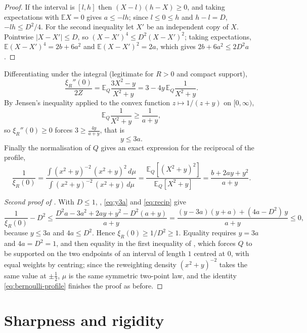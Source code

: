 \documentclass[11pt]{amsart}
\theoremstyle{definition}
\newcommand{\E}{\mathbb{E}}
\begin{document}
\begin{proof}
If the interval is $[l,h]$ then $(X-l)(h-X)\ge0$, and taking expectations with $\E X=0$ gives $a\le-lh$; since $l\le0\le h$ and $h-l=D$, $-lh\le D^2/4$. For the second inequality let $X'$ be an independent copy of $X$. Pointwise $|X-X'|\le D$, so $(X-X')^4\le D^2(X-X')^2$; taking expectations, $\E(X-X')^4=2b+6a^2$ and $\E(X-X')^2=2a$, which gives $2b+6a^2\le 2D^2a$.
\end{proof}

Differentiating under the integral (legitimate for $R>0$ and compact support),
\begin{equation}\label{eq:second}
\frac{\xi_R''(0)}{2Z}=\E_Q\frac{3X^2-y}{X^2+y}=3-4y\,\E_Q\frac1{X^2+y}.
\end{equation}
By Jensen's inequality applied to the convex function $z\mapsto 1/(z+y)$ on $[0,\infty)$,
\[
\E_Q\frac1{X^2+y}\ge\frac1{a+y},
\]
so $\xi_R''(0)\ge0$ forces $3\ge\frac{4y}{a+y}$, that is
\begin{equation}\label{eq:y3a}
y\le3a .
\end{equation}
Finally the normalisation of $Q$ gives an exact expression for the reciprocal of the profile,
\begin{equation}\label{eq:recip}
\frac1{\xi_R(0)}=\frac{\int(x^2+y)^{-2}\,(x^2+y)^2\,d\mu}{\int(x^2+y)^{-2}\,(x^2+y)\,d\mu}
=\frac{\E_Q[(X^2+y)^2]}{\E_Q[X^2+y]}=\frac{b+2ay+y^2}{a+y}.
\end{equation}

\begin{proof}[Second proof of ]
With $D\le 1$, , \eqref{eq:y3a} and \eqref{eq:recip} give
\[
\frac1{\xi_R(0)}-D^2\le\frac{D^2a-3a^2+2ay+y^2-D^2(a+y)}{a+y}
=\frac{(y-3a)(y+a)+(4a-D^2)\,y}{a+y}\le0,
\]
because $y\le3a$ and $4a\le D^2$. Hence $\xi_R(0)\ge1/D^2\ge1$. Equality requires $y=3a$ and $4a=D^2=1$, and then equality in the first inequality of , which forces $Q$ to be supported on the two endpoints of an interval of length $1$ centred at $0$, with equal weights by centring; since the reweighting density $(x^2+y)^{-2}$ takes the same value at $\pm\frac12$, $\mu$ is the same symmetric two-point law, and the identity \eqref{eq:bernoulli-profile} finishes the proof as before.
\end{proof}

\section{Sharpness and rigidity}\label{sec:sharp}
\end{document}
